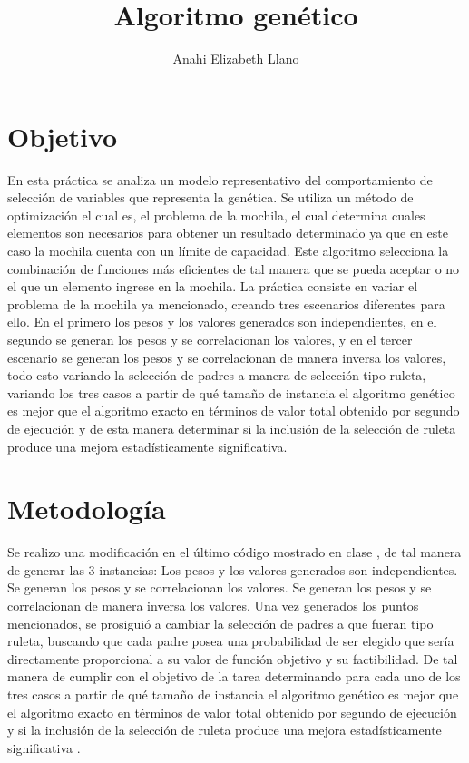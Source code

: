 \documentclass{article}
\begin{document}
\title{\textbf{Algoritmo gen\'etico}}
\author{Anahi Elizabeth Llano}

\maketitle

\section{Objetivo}\label{obj}

En esta pr\'actica se analiza un modelo representativo del comportamiento de selecci\'on de variables que representa la gen\'etica. Se utiliza un m\'etodo de optimizaci\'on el cual es, el problema de la mochila, el cual determina cuales elementos son necesarios para obtener un resultado determinado ya que en este caso la mochila cuenta con un l\'imite de capacidad. Este algoritmo selecciona la combinaci\'on de funciones m\'as eficientes de tal manera que se pueda aceptar o no el que un elemento ingrese en la mochila.
La pr\'actica \cite{elisa} consiste en variar el problema de la mochila ya mencionado, creando tres escenarios diferentes para ello. En el primero los pesos y los valores generados son independientes, en el segundo se generan los pesos y se correlacionan los valores, y en el tercer escenario se generan los pesos y se correlacionan de manera inversa los valores, todo esto variando la selecci\'on de padres a manera de selecci\'on tipo ruleta, variando los tres casos a partir de qu\'e tama\~no de instancia el algoritmo gen\'etico es mejor que el algoritmo exacto en t\'erminos de valor total obtenido por segundo de ejecuci\'on y de esta manera determinar si la inclusi\'on de la selecci\'on de ruleta produce una mejora estad\'isticamente significativa.


\section{Metodolog\'{i}a}\label{met}

Se realizo una modificaci\'on en el \'ultimo c\'odigo mostrado en clase \citep{elisa}, de tal manera de generar las $3$ instancias:
Los pesos y los valores generados son independientes.
Se generan los pesos y se correlacionan los valores.
Se generan los pesos y se correlacionan de manera inversa los valores.
Una vez generados los puntos mencionados, se prosigui\'o a cambiar la selecci\'on de padres a que fueran tipo ruleta, buscando que cada padre posea una probabilidad de ser elegido que ser\'ia directamente proporcional a su valor de funci\'on objetivo y su factibilidad.
De tal manera de cumplir con el objetivo de la tarea determinando para cada uno de los tres casos a partir de qu\'e tama\~no de instancia el algoritmo gen\'etico es mejor que el algoritmo exacto en t\'erminos de valor total obtenido por segundo de ejecuci\'on y si la inclusi\'on de la selecci\'on de ruleta produce una mejora estad\'isticamente significativa \citep{elisadisc}.
\end{document}
